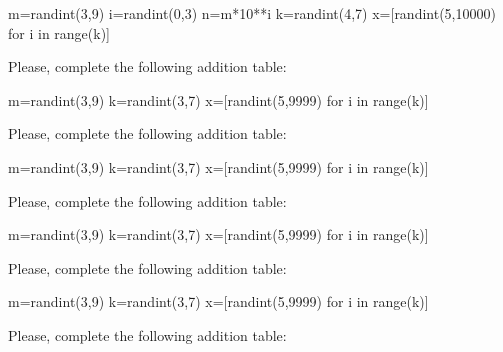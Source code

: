 \documentclass{ximera}
\begin{document}
\begin{problem}
\begin{sagesilent}
m=randint(3,9)
i=randint(0,3)
n=m*10**i
k=randint(4,7)
x=[randint(5,10000) for i in range(k)]
\end{sagesilent}
Please, complete the following addition table:
\end{problem}


\begin{problem}
\begin{sagesilent}
m=randint(3,9)
k=randint(3,7)
x=[randint(5,9999) for i in range(k)]
\end{sagesilent}
Please, complete the following addition table:
\end{problem}


\begin{problem}
\begin{sagesilent}
m=randint(3,9)
k=randint(3,7)
x=[randint(5,9999) for i in range(k)]
\end{sagesilent}
Please, complete the following addition table:
\end{problem}


\begin{problem}
\begin{sagesilent}
m=randint(3,9)
k=randint(3,7)
x=[randint(5,9999) for i in range(k)]
\end{sagesilent}
Please, complete the following addition table:
\end{problem}

\begin{problem}
\begin{sagesilent}
m=randint(3,9)
k=randint(3,7)
x=[randint(5,9999) for i in range(k)]
\end{sagesilent}
Please, complete the following addition table:
\end{problem}
\end{document}
